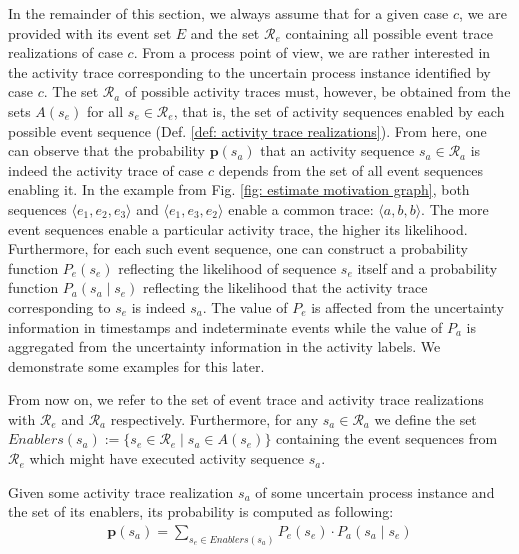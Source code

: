 In the remainder of this section, we always assume that for a given case $c$, we are provided with its event set $E$ and the set $\mathcal{R}_e$ containing all possible event trace realizations of case $c$.
From a process point of view, we are rather interested in the activity trace corresponding to the uncertain process instance identified by case $c$.
The set $\mathcal{R}_a$ of possible activity traces must, however, be obtained from the sets $A(s_e)$ for all $s_e \in \mathcal{R}_e$, that is, the set of activity sequences enabled by each possible event sequence (Def. \ref{def: activity trace realizations}).
From here, one can observe that the probability $\textbf{p}(s_a)$ that an activity sequence $s_a \in \mathcal{R}_a$ is indeed the activity trace of case $c$ depends from the set of all event sequences enabling it.
In the example from Fig. \ref{fig: estimate motivation graph}, both sequences $\langle e_1,e_2,e_3 \rangle$ and $\langle e_1,e_3,e_2 \rangle$ enable a common trace: $\langle a,b,b \rangle$.
The more event sequences enable a particular activity trace, the higher its likelihood.
Furthermore, for each such event sequence, one can construct a probability function $P_e(s_e)$ reflecting the likelihood of sequence $s_e$ itself and a probability function $P_a(s_a \mid s_e)$ reflecting the likelihood that the activity trace corresponding to $s_e$ is indeed $s_a$.
The value of $P_e$ is affected from the uncertainty information in timestamps and indeterminate events while the value of $P_a$ is aggregated from the uncertainty information in the activity labels.
We demonstrate some examples for this later.

From now on, we refer to the set of event trace and activity trace realizations with $\mathcal{R}_e$ and $\mathcal{R}_a$ respectively.
Furthermore, for any $s_a \in \mathcal{R}_a$ we define the set 
$ Enablers(s_a):= \{s_e \in \mathcal{R}_e \mid s_a \in A(s_e)\}$ containing the event sequences from $\mathcal{R}_e$ which might have executed activity sequence $s_a$.

Given some activity trace realization $s_a$ of some uncertain process instance and the set of its enablers, its probability is computed as following:
\begin{align*}
\textbf{p}(s_a) = \sum_{s_e \in Enablers(s_a)}P_e(s_e) \cdot P_a(s_a\mid s_e)
\end{align*} 

